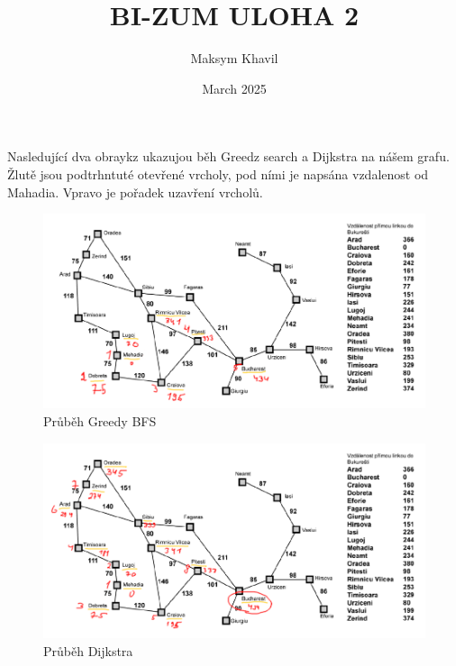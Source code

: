 \documentclass{article}
\title{BI-ZUM ULOHA 2}
\author{Maksym Khavil}
\date{March 2025}
\begin{document}
\maketitle
\newpage
\section{}

Nasledující dva obraykz ukazujou běh Greedz search a Dijkstra na nášem grafu. Žlutě jsou podtrhntuté otevřené vrcholy, pod ními je napsána vzdalenost od Mahadia. Vpravo je pořadek uzavření vrcholů.

\begin{figure}[h]
    \centering
    \includegraphics[width=\linewidth]{zum-greeedy.png}
    \caption{Průběh Greedy BFS}
    \label{fig:sample}
\end{figure}
\begin{figure}[h]
    \centering
    \includegraphics[width=\linewidth]{zum-dijkstra.png}
    \caption{Průběh Dijkstra}
    \label{fig:sample}
\end{figure}

\newpage
\section{}
\end{document}
